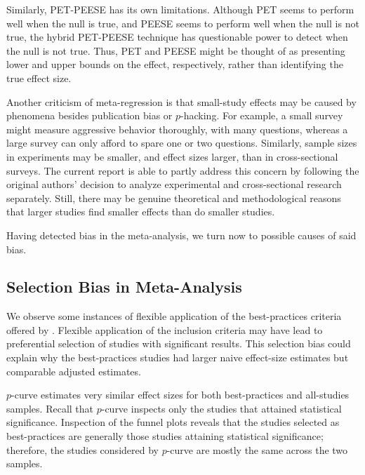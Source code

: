 \documentclass[man]{apa6}
\begin{document}
Similarly, PET-PEESE has its own limitations. Although PET seems to perform well when the null is true, and PEESE seems to perform well when the null is not true, the hybrid PET-PEESE technique has questionable power to detect when the null is not true. Thus, PET and PEESE might be thought of as presenting lower and upper bounds on the effect, respectively, rather than identifying the true effect size. 

Another criticism of meta-regression is that small-study effects may be caused by phenomena besides publication bias or $p$-hacking. For example, a small survey might measure aggressive behavior thoroughly, with many questions, whereas a large survey can only afford to spare one or two questions. Similarly, sample sizes in experiments may be smaller, and effect sizes larger, than in cross-sectional surveys. The current report is able to partly address this concern by following the original authors' decision to analyze experimental and cross-sectional research separately. Still, there may be genuine theoretical and methodological reasons that larger studies find smaller effects than do smaller studies. %

Having detected bias in the meta-analysis, we turn now to possible causes of said bias.

\subsection{Selection Bias in Meta-Analysis} 
We observe some instances of flexible application of the best-practices criteria offered by \citet{Anderson:etal:2010}. Flexible application of the inclusion criteria may have lead to preferential selection of studies with significant results. This selection bias could explain why the best-practices studies had larger naive effect-size estimates but comparable adjusted estimates.

$p$-curve estimates very similar effect sizes for both best-practices and all-studies samples. Recall that $p$-curve inspects only the studies that attained statistical significance. Inspection of the funnel plots reveals that the studies selected as best-practices are generally those studies attaining statistical significance; therefore, the studies considered by $p$-curve are mostly the same across the two samples.
\end{document}
